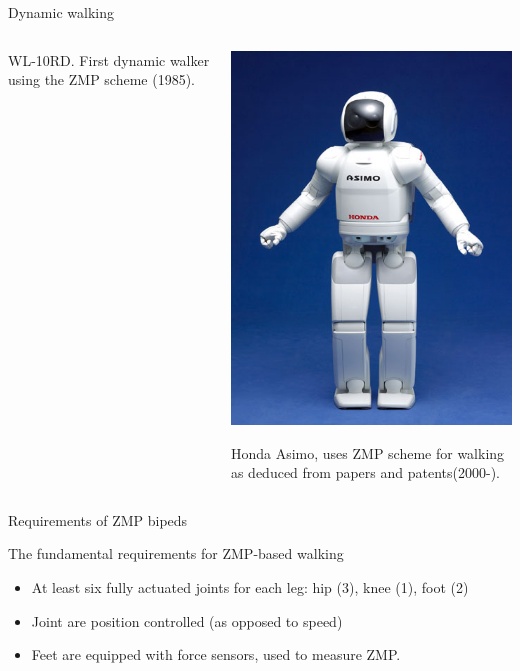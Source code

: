 \documentclass[compress]{beamer}
\begin{document}
\begin{frame}{Dynamic walking}
\begin{columns}
\begin{column}{0.5\linewidth}
\begin{center}
    WL-10RD. First dynamic walker using the ZMP scheme (1985).
            \end{center}
        \end{column}
        \begin{column}{0.5\linewidth}
            \begin{center}
                \includegraphics[height=0.5\paperheight]{image47}

    Honda Asimo, uses ZMP scheme for walking as deduced from papers and
    patents(2000-). 
            \end{center}
        \end{column}
    \end{columns}


\end{frame}

\begin{frame}{Requirements of ZMP bipeds}

    The fundamental requirements for ZMP-based walking

    \begin{itemize}

        \item At least six fully actuated joints for each leg: hip (3), knee (1),
            foot (2)
        \item Joint are position controlled (as opposed to speed)
        \item Feet are equipped with force sensors, used to measure ZMP.
    \end{itemize}

\end{frame}
\end{document}
